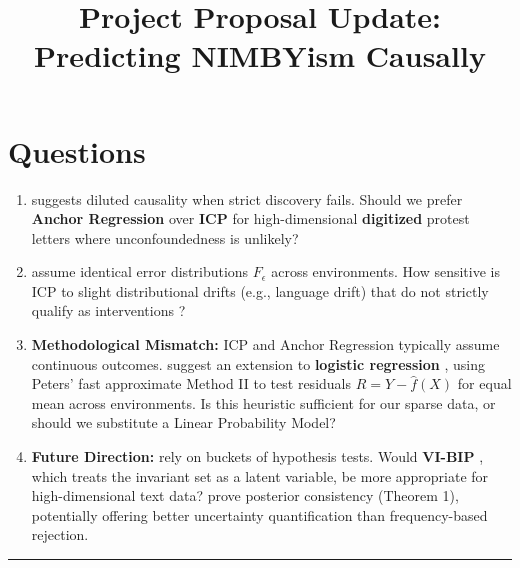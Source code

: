 \documentclass[11pt]{article}
\begin{document}
\section*{Questions}
\begin{enumerate}
    \item \textcite{buhlmann2020} suggests diluted causality \autocite[Sec.~4.3.2]{buhlmann2020}
    when strict discovery fails. Should we prefer \textbf{Anchor Regression} \autocite{buhlmann2020}
    over \textbf{ICP} \autocite{peters2016}
    for high-dimensional \textbf{digitized} protest letters where unconfoundedness \autocite{peters2018}
    is unlikely?
    \item \textcite{peters2016} assume identical error distributions \autocite[Assumption~1]{peters2016}
    $F_\epsilon$ across environments. How sensitive is ICP to slight distributional drifts \autocite{peters2018}
    (e.g., language drift) that do not strictly qualify as interventions \autocite{peters2018}
    ?
    \item \textbf{Methodological Mismatch:} ICP and Anchor Regression typically assume continuous outcomes. \textcite{peters2016} suggest an extension to \textbf{logistic regression} \autocite[Sec.~6.3]{peters2016},
    using Peters' fast approximate Method II \autocite[Sec.~3.1.2]{peters2016} to test residuals $R = Y - \hat{f}(X)$ for equal mean across environments. Is this heuristic sufficient for our sparse data, or should we substitute a Linear Probability Model?
    \item \textbf{Future Direction:} \textcite{peters2016} rely on buckets of hypothesis tests. Would \textbf{VI-BIP} \autocite[Algorithm~2]{wu2025b}, which treats the invariant set as a latent variable, be more appropriate for high-dimensional text data? \textcite{wu2025b} prove posterior consistency (Theorem 1), potentially offering better uncertainty quantification than frequency-based rejection.
\end{enumerate}

\newpage
\title{\vspace{-2em}\textbf{Project Proposal Update: Predicting NIMBYism Causally}}
\vspace{1em}
\hrule
\vspace{1em}
\end{document}
